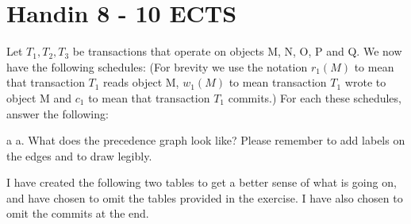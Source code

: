 \documentclass[working, oneside]{../../Preambles/tuftebook}
\begin{document}
\let\cleardoublepage\clearpage
\thispagestyle{fancy}
\chapter{Handin 8 - 10 ECTS}
\begin{exercise}[1]
Let $T_1, T_2, T_3$ be transactions that operate on objects M, N, O, P and Q. We now have
the following schedules:
(For brevity we use the notation $r_1\left( M \right) $ to mean that transaction $T_1$ reads object M,
$w_1\left( M \right) $ to mean transaction $T_1$ wrote to object M and $c_1$ to mean that transaction $T_1$ commits.)
\newline
For each these schedules, answer the following:
\end{exercise}
\begin{subexercise}{a}
a. What does the precedence graph look like? Please remember to add labels on
the edges and to draw legibly.
\end{subexercise}
I have created the following two tables to get a better sense of what is going on, and have chosen to omit the tables provided in the exercise. I have also chosen to omit the commits at the end.
\end{document}
